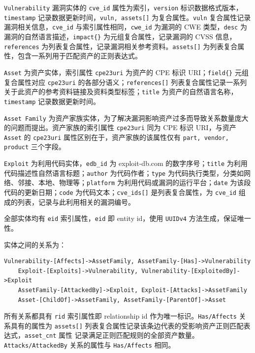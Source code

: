 \documentclass[a4paper,AutoFakeBold,oneside,12pt]{book}
\begin{document}
\lstinline|Vulnerability| 漏洞实体的 \lstinline|cve_id| 属性为索引，\lstinline|version| 标识数据格式版本，\lstinline|timestamp| 记录数据更新时间，\lstinline|vuln, assets[]| 为复合属性。\lstinline|vuln| 复合属性记录漏洞相关信息，\lstinline|cve_id| 与索引属性相同，\lstinline|cwe_id| 为漏洞的 CWE 类型，\lstinline|desc| 为漏洞的自然语言描述，\lstinline|impact{}| 为元组复合属性，记录漏洞的 CVSS 信息，\lstinline|references| 为列表复合属性，记录漏洞相关参考资料。\lstinline|assets[]| 为列表复合属性，包含一系列用于匹配资产的正则表达式。

\lstinline|Asset| 为资产实体，索引属性 \lstinline|cpe23uri| 为资产的 CPE 标识 URI；\lstinline|field{}| 元组复合属性对应 \lstinline|cpe23uri| 的各部分语义；\lstinline|references[]| 列表复合属性记录一系列关于此资产的参考资料链接及资料类型标签；\lstinline|title| 为资产的自然语言名称，\lstinline|timestamp| 记录数据更新时间。

\lstinline|Asset Family| 为资产家族实体，为了解决漏洞影响资产过多而导致关系数量庞大的问题而提出。资产家族的索引属性 \lstinline|cpe23uri| 同为 CPE 标识 URI，与资产 \lstinline|Asset| 的 \lstinline|cpe23uri| 属性区别在于，资产家族的该属性仅有 \lstinline|part, vendor, product| 三个字段。

\lstinline|Exploit| 为利用代码实体，\lstinline|edb_id| 为 exploit-db.com 的数字序号；\lstinline|title| 为利用代码描述性自然语言标题；\lstinline|author| 为代码作者；\lstinline|type| 为代码执行类型，分类如网络、邻接、本地、物理等；\lstinline|platform| 为利用代码或漏洞的运行平台；\lstinline|date| 为该段代码的更新日期；\lstinline|code| 为代码文本；\lstinline|cve_ids[]| 是列表复合属性，为 \lstinline|cve_id| 组成的列表，记录与此利用相关的漏洞编号。

全部实体均有 \lstinline|eid| 索引属性，\lstinline|eid| 即 entity id，使用 \lstinline|UUIDv4| 方法生成，保证唯一性。

实体之间的关系为：

\begin{lstlisting}[label={lst:neo4j_rels},breaklines,style=lgeneral]
	Vulnerability-[Affects]->AssetFamily, AssetFamily-[Has]->Vulnerability
	Exploit-[Exploits]->Vulnerability, Vulnerability-[ExploitedBy]->Exploit
	AssetFamily-[AttackedBy]->Exploit, Exploit-[Attacks]->AssetFamily
	Asset-[ChildOf]->AssetFamily, AssetFamily-[ParentOf]->Asset
\end{lstlisting}

所有关系都具有 \lstinline|rid| 索引属性即 relationship id 作为唯一标识。\lstinline|Has/Affects| 关系具有的属性为 \lstinline|assets[]| 列表复合属性记录该条边代表的受影响资产正则匹配表达式，\lstinline|asset_cnt| 属性
记录满足正则匹配规则的全部资产数量。\lstinline|Attacks/AttackedBy| 关系的属性与 \lstinline|Has/Affects| 相同。
\end{document}
